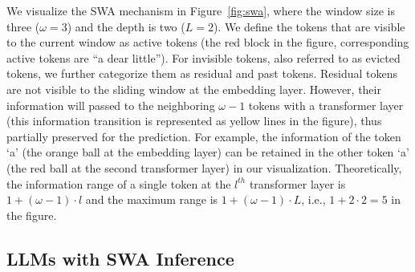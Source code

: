 We visualize the SWA mechanism in Figure~\ref{fig:swa}, where the window size is three ($\omega=3$) and the depth is two ($L=2$).
We define the tokens that are visible to the current window as active tokens (the red block in the figure, corresponding active tokens are ``a dear little'').
For invisible tokens, also referred to as evicted tokens, we further categorize them as residual and past tokens. 
Residual tokens are not visible to the sliding window at the embedding layer. However, their information will passed to the neighboring $\omega -1$ tokens with a transformer layer (this information transition is represented as yellow lines in the figure), thus partially preserved for the prediction. For example, the information of the token `a' (the orange ball at the embedding layer) can be retained in the other token `a' (the red ball at the second transformer layer) in our visualization. Theoretically, the information range of a single token at the $l^{th}$ transformer layer is $1+(\omega-1) \cdot l$ and the maximum range is $1+(\omega-1) \cdot L$, i.e., $1+2\cdot2=5$ in the figure.



\subsection{LLMs with SWA Inference}
\label{ssec:why}


